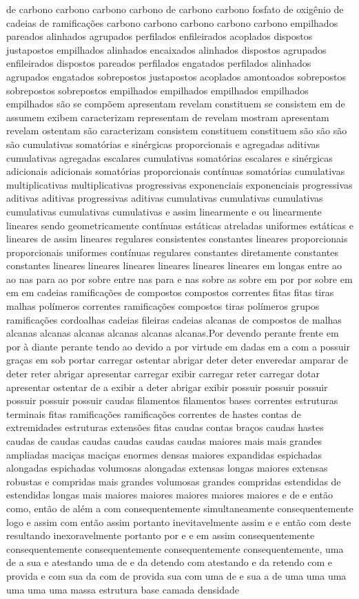 de carbono carbono carbono carbono de carbono carbono fosfato de oxigênio de cadeias de ramificações carbono carbono carbono carbono carbono empilhados pareados alinhados agrupados perfilados enfileirados acoplados dispostos justapostos empilhados alinhados encaixados alinhados dispostos agrupados enfileirados dispostos pareados perfilados engatados perfilados alinhados agrupados engatados sobrepostos justapostos acoplados amontoados sobrepostos sobrepostos sobrepostos empilhados empilhados empilhados empilhados empilhados são se compõem apresentam revelam constituem se consistem em de assumem exibem caracterizam representam de revelam mostram apresentam revelam ostentam são caracterizam consistem constituem constituem são são são são cumulativas somatórias e sinérgicas proporcionais e agregadas aditivas cumulativas agregadas escalares cumulativas somatórias escalares e sinérgicas adicionais adicionais somatórias proporcionais contínuas somatórias cumulativas multiplicativas multiplicativas progressivas exponenciais exponenciais progressivas aditivas aditivas progressivas aditivas cumulativas cumulativas cumulativas cumulativas cumulativas cumulativas e assim linearmente e ou linearmente lineares sendo geometricamente contínuas estáticas atreladas uniformes estáticas e lineares de assim lineares regulares consistentes constantes lineares proporcionais proporcionais uniformes contínuas regulares constantes diretamente constantes constantes lineares lineares lineares lineares lineares lineares em longas entre ao ao nas para ao por sobre entre nas para e nas sobre as sobre em por por sobre em em em cadeias ramificações de compostos compostos correntes fitas fitas tiras malhas polímeros correntes ramificações compostos tiras polímeros grupos ramificações cordoalhas cadeias fileiras cadeias alcanas de compostos de malhas alcanas alcanas alcanas alcanas alcanas alcanas.Por devendo perante frente em por à diante perante tendo ao devido a por virtude em dadas em a com a possuir graças em sob portar carregar ostentar abrigar deter deter enveredar amparar de deter reter abrigar apresentar carregar exibir carregar reter carregar dotar apresentar ostentar de a exibir a deter abrigar exibir possuir possuir possuir possuir possuir possuir caudas filamentos filamentos bases correntes estruturas terminais fitas ramificações ramificações correntes de hastes contas de extremidades estruturas extensões fitas caudas contas braços caudas hastes caudas de caudas caudas caudas caudas caudas maiores mais mais grandes ampliadas maciças maciças enormes densas maiores expandidas espichadas alongadas espichadas volumosas alongadas extensas longas maiores extensas robustas e compridas mais grandes volumosas grandes compridas estendidas de estendidas longas mais maiores maiores maiores maiores maiores e de e então como, então de além a com consequentemente simultaneamente consequentemente logo e assim com então assim portanto inevitavelmente assim e e então com deste resultando inexoravelmente portanto por e e em assim consequentemente consequentemente consequentemente consequentemente consequentemente, uma de a sua e atestando uma de e da detendo com atestando e da retendo com e provida e com sua da com de provida sua com uma de e sua a de uma uma uma uma uma uma massa estrutura base camada densidade 